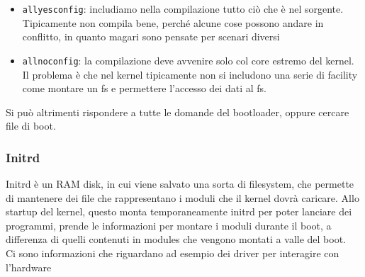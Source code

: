 \documentclass[12pt, oneside]{extbook}
\begin{document}
\begin{itemize}
\item \texttt{allyesconfig}: includiamo nella compilazione tutto ciò che è nel sorgente. Tipicamente non compila bene, perché alcune cose possono andare in conflitto, in quanto magari sono pensate per scenari diversi
\item \texttt{allnoconfig}: la compilazione deve avvenire solo col core estremo del kernel. Il problema è che nel kernel tipicamente non si includono una serie di facility come montare un fs e permettere l'accesso dei dati al fs.
\end{itemize}
Si può altrimenti rispondere a tutte le domande del bootloader, oppure cercare file di boot.
\subsubsection{Initrd} 
Initrd è un RAM disk, in cui viene salvato una sorta di filesystem, che permette di mantenere dei file che rappresentano i moduli che il kernel dovrà caricare. Allo startup del kernel, questo monta temporaneamente initrd per poter lanciare dei programmi, prende le informazioni per montare i moduli durante il boot, a differenza di quelli contenuti in modules che vengono montati a valle del boot.\\ Ci sono informazioni che riguardano ad esempio dei driver per interagire con l'hardware
\end{document}
